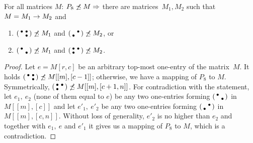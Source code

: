\begin{lemma}
\label{lemma:p72}
For all matrices $M$: $P_8\not\preceq M\Rightarrow$ there are matrices~$M_1,M_2$ such that $M=M_1\rightarrow M_2$ and
\begin{enumerate}
\item $\left(\begin{smallmatrix}\bullet&\bullet\\ &\bullet\end{smallmatrix}\right)\not\preceq M_1$ and $\left(\begin{smallmatrix} &\bullet\\\bullet& \end{smallmatrix}\right)\not\preceq M_2$, or
\item $\left(\begin{smallmatrix}\bullet& \\ &\bullet\end{smallmatrix}\right)\not\preceq M_1$ and $\left(\begin{smallmatrix}\bullet&\bullet\\\bullet& \end{smallmatrix}\right)\not\preceq M_2$.
\end{enumerate}
\end{lemma}
\begin{proof}
Let $e=M[r,c]$ be an arbitrary top-most one-entry of the matrix~$M$. It holds $\left(\begin{smallmatrix}\bullet&\bullet\\ &\bullet\end{smallmatrix}\right)\not\preceq M[[m],[c-1]]$; otherwise, we have a mapping of $P_8$ to $M$. Symmetrically, $\left(\begin{smallmatrix}\bullet&\bullet\\\bullet& \end{smallmatrix}\right)\not\preceq M[[m],[c+1,n]]$. For contradiction with the statement, let $e_1,\ e_2$ (none of them equal to $e$) be any two one-entries forming $\left(\begin{smallmatrix}\bullet& \\ &\bullet\end{smallmatrix}\right)$ in $M[[m],[c]]$ and let $e'_1,\ e'_2$ be any two one-entries forming $\left(\begin{smallmatrix} &\bullet\\\bullet& \end{smallmatrix}\right)$ in $M[[m],[c,n]]$. Without loss of generality, $e'_2$ is no higher than $e_2$ and together with $e_1,\ e$ and $e'_1$ it gives us a mapping of $P_8$ to $M$, which is a contradiction.
\end{proof}

